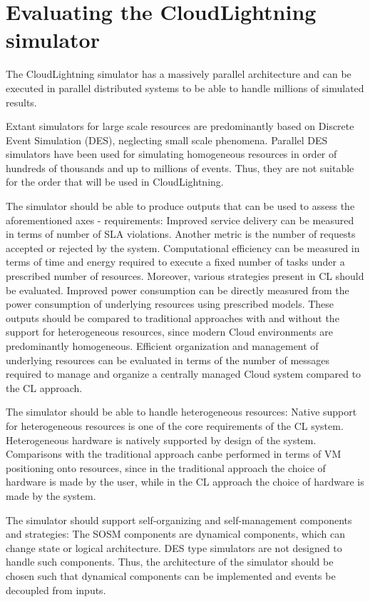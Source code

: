 \section{Evaluating the CloudLightning simulator}

The CloudLightning simulator has a massively parallel architecture and can be executed in parallel distributed systems to be able to handle millions of simulated results.

Extant simulators for large scale resources are predominantly based on Discrete Event Simulation (DES), neglecting small scale phenomena. Parallel DES simulators have been used for simulating homogeneous resources in order of hundreds of thousands and up to millions of events. Thus, they are not suitable for the order that will be used in CloudLightning.

The simulator should be able to produce outputs that can be used to assess the aforementioned axes - requirements: Improved service delivery can be measured in terms of number of SLA violations. Another metric is the number of requests accepted or rejected by the system. Computational efficiency can be measured in terms of time and energy required to execute a fixed number of tasks under a prescribed number of resources. Moreover, various strategies present in CL should be evaluated. Improved power consumption can be directly measured from the power consumption of underlying resources using prescribed models. These outputs should be compared to traditional approaches with and without the support for heterogeneous resources, since modern Cloud environments are predominantly homogeneous. Efficient organization and management of underlying resources can be evaluated in terms of the number of messages required to manage and organize a centrally managed Cloud system compared to the CL approach.

The simulator should be able to handle heterogeneous resources: Native support for heterogeneous resources is one of the core requirements of the CL system. Heterogeneous hardware is natively supported by design of the system. Comparisons with the traditional approach canbe performed in terms of VM positioning onto resources, since in the traditional approach the choice of hardware is made by the user, while in the CL approach the choice of hardware is made by the system.

The simulator should support self-organizing and self-management components and strategies: The SOSM components are dynamical components, which can change state or logical architecture. DES type simulators are not designed to handle such components. Thus, the architecture of the simulator should be chosen such that dynamical components can be implemented and events be decoupled from inputs.

